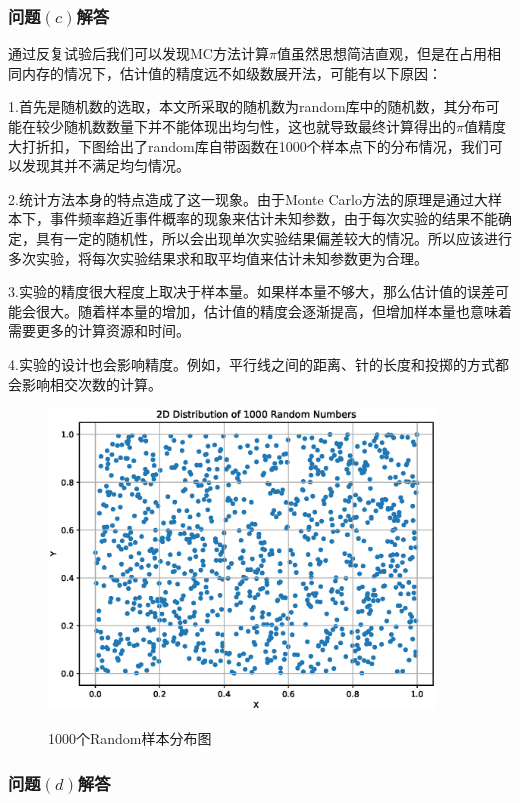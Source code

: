 \documentclass[12pt,a4paper]{article}%
\begin{document}
\subsubsection{问题$\left(c\right)$解答}
通过反复试验后我们可以发现MC方法计算$\pi$值虽然思想简洁直观，但是在占用相同内存的情况下，估计值的精度远不如级数展开法，可能有以下原因：

1.首先是随机数的选取，本文所采取的随机数为random库中的随机数，其分布可能在较少随机数数量下并不能体现出均匀性，这也就导致最终计算得出的$\pi$值精度大打折扣，下图给出了random库自带函数在1000个样本点下的分布情况，我们可以发现其并不满足均匀情况。

2.统计方法本身的特点造成了这一现象。由于Monte Carlo方法的原理是通过大样本下，事件频率趋近事件概率的现象来估计未知参数，由于每次实验的结果不能确定，具有一定的随机性，所以会出现单次实验结果偏差较大的情况。所以应该进行多次实验，将每次实验结果求和取平均值来估计未知参数更为合理。

3.实验的精度很大程度上取决于样本量。如果样本量不够大，那么估计值的误差可能会很大。随着样本量的增加，估计值的精度会逐渐提高，但增加样本量也意味着需要更多的计算资源和时间。

4.实验的设计也会影响精度。例如，平行线之间的距离、针的长度和投掷的方式都会影响相交次数的计算。

\begin{figure}[htbp]
    \centering
    \includegraphics[height=8cm]{Random样本分布图.eps}\label{样本点分布图}
    \caption{1000个Random样本分布图}
\end{figure}

\subsubsection{问题$\left(d\right)$解答}
\end{document}
